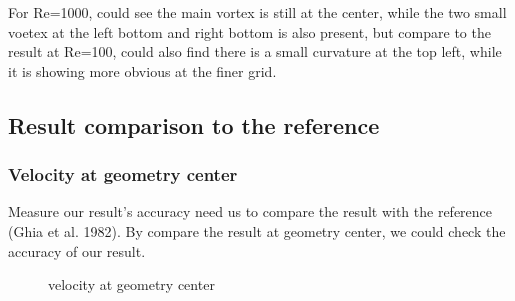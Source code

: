 \documentclass[12pt]{article}
\begin{document}
For Re=1000, could see the main vortex 
is still at the center, while the two 
small voetex at the left bottom and 
right bottom is also present, 
but compare to the result at Re=100, 
could also find there is a small curvature 
at the top left, while it is showing 
more obvious at the finer grid.



\subsection{Result comparison to the reference}

\subsubsection{Velocity at geometry center}

Measure our result's accuracy need us to compare the result with the reference (Ghia et al. 1982). By compare the result at geometry center, we could check the accuracy of our result. 


\begin{figure}[H]
    \centering
    \caption{velocity at geometry center}
\end{figure}
\end{document}
